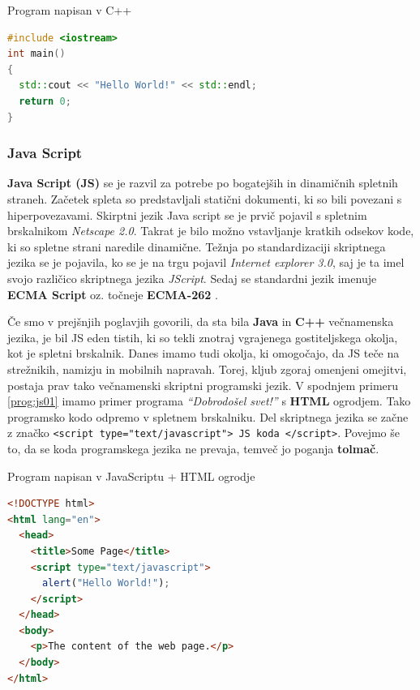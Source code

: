 \begin{examplebox}[label={prog:cpp01}]{Program napisan v C++}
\begin{lstlisting}[language=C++]
#include <iostream>
int main()
{
  std::cout << "Hello World!" << std::endl;
  return 0;
}
\end{lstlisting}
\end{examplebox}

\subsubsection{Java Script}
\label{sec:pj_JS}

\textbf{Java Script (JS)} se je razvil za potrebe po bogatejših in dinamičnih
spletnih straneh. Začetek spleta so predstavljali statični dokumenti,
ki so bili povezani s hiperpovezavami. Skirptni jezik Java
script se je prvič pojavil s spletnim brskalnikom \emph{Netscape
  2.0}. Takrat je bilo možno vstavljanje kratkih odsekov kode, ki so
spletne strani naredile dinamične. Težnja po standardizaciji
skriptnega jezika se je pojavila, ko se je na trgu pojavil
\emph{Internet explorer 3.0}, saj je ta imel svojo različico skriptnega
jezika \emph{JScript}. Sedaj se standardni jezik imenuje \textbf{ECMA
  Script} oz. točneje \textbf{ECMA-262} \cite{OO-JS}.

Če smo v prejšnjih poglavjih govorili, da sta bila \textbf{Java} in
\textbf{C++} večnamenska jezika, je bil JS eden tistih, ki so tekli
znotraj vgrajenega gostiteljskega okolja, kot je spletni
brskalnik. Danes imamo tudi okolja, ki omogočajo, da JS teče na
strežnikih, namizju in mobilnih napravah. Torej, kljub zgoraj
omenjeni omejitvi, postaja prav tako večnamenski skriptni programski
jezik. V spodnjem primeru  \ref{prog:js01} imamo primer programa
\emph{``Dobrodošel svet!''} s \textbf{HTML} ogrodjem. Tako programsko
kodo odpremo v spletnem brskalniku. Del skriptnega jezika se začne z
značko \texttt{<script type="text/javascript"> JS koda
  </script>}. Povejmo še to, da se koda programskega jezika ne
prevaja, temveč jo poganja \textbf{tolmač}.


\begin{examplebox}[label={prog:js01}]{Program napisan v JavaScriptu +
    HTML ogrodje}
\begin{lstlisting}[language=Html]
<!DOCTYPE html>
<html lang="en">
  <head>
    <title>Some Page</title>
    <script type="text/javascript">
      alert("Hello World!");
    </script>
  </head>
  <body>
    <p>The content of the web page.</p>
  </body>
</html>
\end{lstlisting}
\end{examplebox}


